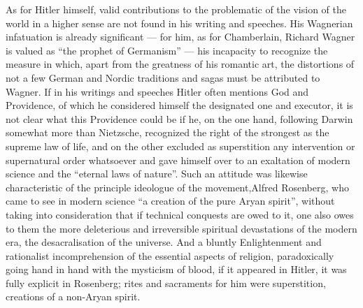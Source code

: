 \begin{quotex}
As for Hitler himself, valid contributions to the problematic of the vision of the world in a higher sense are not found in his writing and speeches. His Wagnerian infatuation is already significant --- for him, as for Chamberlain, Richard Wagner is valued as ``the prophet of Germanism'' --- his incapacity to recognize the measure in which, apart from the greatness of his romantic art, the distortions of not a few German and Nordic traditions and sagas must be attributed to Wagner. If in his writings and speeches Hitler often mentions God and Providence, of which he considered himself the designated one and executor, it is not clear what this Providence could be if he, on the one hand, following Darwin somewhat more than Nietzsche, recognized the right of the strongest as the supreme law of life, and on the other excluded as superstition any intervention or supernatural order whatsoever and gave himself over to an exaltation of modern science and the ``eternal laws of nature''. Such an attitude was likewise characteristic of the principle ideologue of the movement,Alfred Rosenberg, who came to see in modern science ``a creation of the pure Aryan spirit'', without taking into consideration that if technical conquests are owed to it, one also owes to them the more deleterious and irreversible spiritual devastations of the modern era, the desacralisation of the universe. And a bluntly Enlightenment and rationalist incomprehension of the essential aspects of religion, paradoxically going hand in hand with the mysticism of blood, if it appeared in Hitler, it was fully explicit in Rosenberg; rites and sacraments for him were superstition, creations of a non-Aryan spirit.
\end{quotex}



